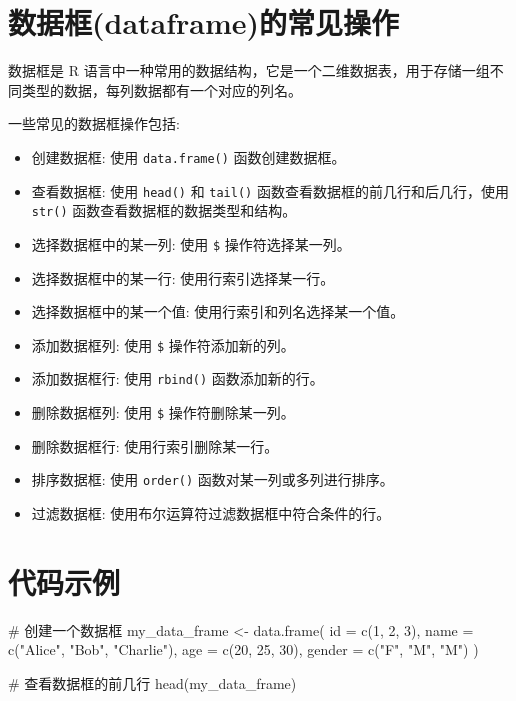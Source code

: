 \documentclass[
  letterpaper,
  DIV=11,
  numbers=noendperiod]{scrreprt}
\newenvironment{Shaded}{\begin{snugshade}}{\end{snugshade}}
\newcommand{\AttributeTok}[1]{\textcolor[rgb]{0.40,0.45,0.13}{#1}}
\newcommand{\CommentTok}[1]{\textcolor[rgb]{0.37,0.37,0.37}{#1}}
\newcommand{\DecValTok}[1]{\textcolor[rgb]{0.68,0.00,0.00}{#1}}
\newcommand{\FunctionTok}[1]{\textcolor[rgb]{0.28,0.35,0.67}{#1}}
\newcommand{\NormalTok}[1]{\textcolor[rgb]{0.00,0.23,0.31}{#1}}
\newcommand{\OtherTok}[1]{\textcolor[rgb]{0.00,0.23,0.31}{#1}}
\newcommand{\StringTok}[1]{\textcolor[rgb]{0.13,0.47,0.30}{#1}}
\providecommand{\tightlist}{%
  \setlength{\itemsep}{0pt}\setlength{\parskip}{0pt}}\usepackage{longtable,booktabs,array}
\begin{document}
\section{数据框(dataframe)的常见操作}\label{ux6570ux636eux6846dataframeux7684ux5e38ux89c1ux64cdux4f5c}

数据框是 R
语言中一种常用的数据结构，它是一个二维数据表，用于存储一组不同类型的数据，每列数据都有一个对应的列名。

一些常见的数据框操作包括:

\begin{itemize}
\tightlist
\item
  创建数据框: 使用 \texttt{data.frame()} 函数创建数据框。
\item
  查看数据框: 使用 \texttt{head()} 和 \texttt{tail()}
  函数查看数据框的前几行和后几行，使用 \texttt{str()}
  函数查看数据框的数据类型和结构。
\item
  选择数据框中的某一列: 使用 \texttt{\$} 操作符选择某一列。
\item
  选择数据框中的某一行: 使用行索引选择某一行。
\item
  选择数据框中的某一个值: 使用行索引和列名选择某一个值。
\item
  添加数据框列: 使用 \texttt{\$} 操作符添加新的列。
\item
  添加数据框行: 使用 \texttt{rbind()} 函数添加新的行。
\item
  删除数据框列: 使用 \texttt{\$} 操作符删除某一列。
\item
  删除数据框行: 使用行索引删除某一行。
\item
  排序数据框: 使用 \texttt{order()} 函数对某一列或多列进行排序。
\item
  过滤数据框: 使用布尔运算符过滤数据框中符合条件的行。
\end{itemize}

\section{代码示例}\label{ux4ee3ux7801ux793aux4f8b}

\begin{Shaded}
\begin{Highlighting}[]
\CommentTok{\# 创建一个数据框}
\NormalTok{my\_data\_frame }\OtherTok{\textless{}{-}} \FunctionTok{data.frame}\NormalTok{(}
  \AttributeTok{id =} \FunctionTok{c}\NormalTok{(}\DecValTok{1}\NormalTok{, }\DecValTok{2}\NormalTok{, }\DecValTok{3}\NormalTok{),}
  \AttributeTok{name =} \FunctionTok{c}\NormalTok{(}\StringTok{"Alice"}\NormalTok{, }\StringTok{"Bob"}\NormalTok{, }\StringTok{"Charlie"}\NormalTok{),}
  \AttributeTok{age =} \FunctionTok{c}\NormalTok{(}\DecValTok{20}\NormalTok{, }\DecValTok{25}\NormalTok{, }\DecValTok{30}\NormalTok{),}
  \AttributeTok{gender =} \FunctionTok{c}\NormalTok{(}\StringTok{"F"}\NormalTok{, }\StringTok{"M"}\NormalTok{, }\StringTok{"M"}\NormalTok{)}
\NormalTok{)}

\CommentTok{\# 查看数据框的前几行}
\FunctionTok{head}\NormalTok{(my\_data\_frame)}
\end{Highlighting}
\end{Shaded}
\end{document}

